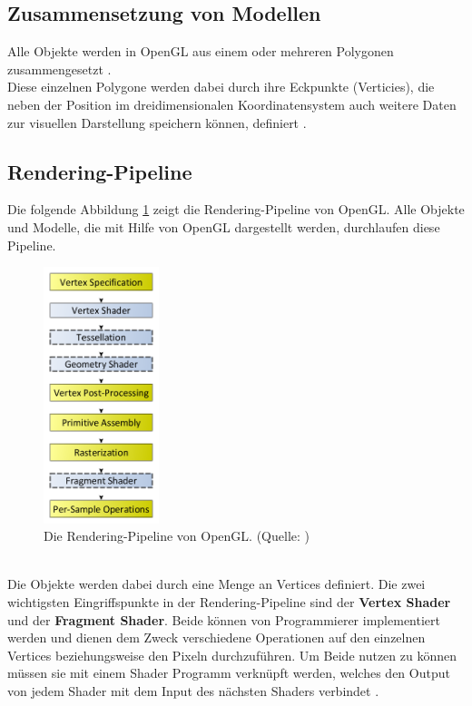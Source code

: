 \subsection{Zusammensetzung von Modellen}
Alle Objekte werden in OpenGL aus einem oder mehreren Polygonen zusammengesetzt \citep[S. 5]{shreiner:opengl}.\\
Diese einzelnen Polygone werden dabei durch ihre Eckpunkte (Verticies), die neben der Position im dreidimensionalen Koordinatensystem auch weitere Daten zur visuellen Darstellung speichern können, definiert \citep{vries:learn-opengl-triangle}. 

\subsection{Rendering-Pipeline} Die folgende Abbildung \ref{fig:rendering-pipeline} zeigt die Rendering-Pipeline von OpenGL. Alle Objekte und Modelle, die mit Hilfe von OpenGL dargestellt werden, durchlaufen diese Pipeline. 
\begin{figure}[h!]
\centering
\includegraphics[width=0.3\textwidth]{Abbildungen/rendering-pipeline-opengl.png}
\caption[OpenGL: Rendering Pipline]{Die Rendering-Pipeline von OpenGL. (Quelle: \citet{khronos:rendering-pipeline})}
\label{fig:rendering-pipeline}
\end{figure}\\
Die Objekte werden dabei durch eine Menge an Vertices definiert. Die zwei wichtigsten Eingriffspunkte in der Rendering-Pipeline sind der \textbf{Vertex Shader} und der \textbf{Fragment Shader}. Beide können von Programmierer implementiert werden und dienen dem Zweck verschiedene Operationen auf den einzelnen Vertices beziehungsweise den Pixeln durchzuführen. Um Beide nutzen zu können müssen sie mit einem Shader Programm verknüpft werden, welches den Output von jedem Shader mit dem Input des nächsten Shaders verbindet \citep{vries:learn-opengl-triangle}.\\
